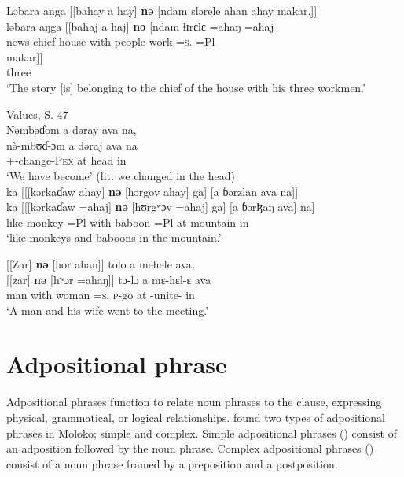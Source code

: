 \ea \label{ex:5:117}
Ləbara  anga  [[bahay  a  hay]  \textbf{nə}  [ndam  slərele  ahan  ahay  makar.]]\\
\gll  ləbara  aŋga  [[bahaj   a   haj]  \textbf{nə}  [ndam   ɬɪrɛlɛ   =ahaŋ       =ahaj \\          
      news  {\POSS}  chief  {\GEN}  house  with  people  work  =\textsc{s}.{\POSS}    =Pl\\    
      
      \medskip
\gll makar]]\\
     three\\
\glt  ‘The story [is] belonging to the chief of the house with his three workmen.’
\z

\clearpage
\ea \label{ex:5:118}\corpussource Values, S. 47\\
Nəmbəɗom  a  dəray  ava  na, \\ 
\gll  n\`{ə}-mbʊɗ{}-ɔm      a  dəraj  ava  na\\
      +{\PFV}-change-\textsc{Pex}  at   head  in    {\PSP}\\
\glt  ‘We have become’ (lit. we changed in the head)\\
\medskip
ka [[[kərkaɗaw  ahay]  \textbf{nə}  [hərgov  ahay]  ga]  [a  ɓərzlan  ava   na]]\\
\gll  ka [[[kərkaɗaw =ahaj] \textbf{nə} [hʊrgʷɔv =ahaj] ga] [a  ɓərɮaŋ ava] na]\\
      like        monkey    =Pl        with    baboon      =Pl  {\ADJ}  at    mountain    in    {\PSP}\\
\glt  ‘like monkeys and baboons in the mountain.’
\z

\ea \label{ex:5:119}
{}[[Zar]  \textbf{nə}  [hor  ahan]]  tolo  a  mehele  ava.\\
\gll  {}[[zar]    \textbf{nə}  [hʷɔr  =ahaŋ]]  tɔ-lɔ  a  mɛ-hɛl-ɛ    ava\\
      man    with  woman  =\textsc{s}.{\POSS}  \textsc{p}-go  at  {\NOM}{}-unite{}-{\CL}  in\\
\glt  ‘A man and his wife went to the meeting.’ 
\z

\section{Adpositional phrase}\label{sec:5.6}
\hypertarget{RefHeading1211821525720847}{}
Adpositional phrases function to relate noun phrases to the clause, expressing physical, grammatical, or logical relationships.  \citet{FriesenMamalis2008} found two types of adpositional phrases in Moloko; simple and complex. Simple adpositional phrases () consist of an adposition followed by the noun phrase. Complex adpositional phrases () consist of a noun phrase framed by a preposition and a postposition. 

